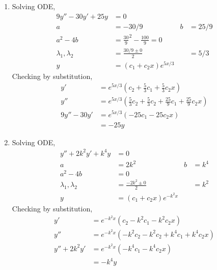 \begin{enumerate}
    \item Solving ODE,
          \begin{align}
              9y'' - 30y' + 25y        & = 0                                                 \\
              a                        & = -30/9                                & b & = 25/9 \\
              a^{2} - 4b               & = \frac{30}{9}^{2} - \frac{100}{9} = 0              \\
              \lambda_{1}, \lambda_{2} & = \frac{30/9 \pm 0}{2}                 &   & = 5/3  \\
              y                        & = (c_{1}+ c_{2}x)e^{5x/3}
          \end{align}
          Checking by substitution,
          \begin{align}
              y'         & = e^{5x/3}\left( c_{2} + \frac{5}{3} c_{1} + \frac{5}{3} c_{2}x \right)                                 \\
              y''        & = e^{5x/3}\left( \frac{5}{3} c_{2} + \frac{5}{3} c_{2} + \frac{25}{9}c_{1} + \frac{25}{9}c_{2}x \right) \\
              9y''- 30y' & = e^{5x/3}(-25c_{1} - 25c_{2}x)                                                                         \\
                         & = -25y
          \end{align}

    \item Solving ODE,
          \begin{align}
              y'' + 2k^{2}y' + k^{4}y  & = 0                                        \\
              a                        & = 2k^{2}                     & b & = k^{4} \\
              a^{2} - 4b               & = 0                                        \\
              \lambda_{1}, \lambda_{2} & = \frac{-2k^{2} \pm 0}{2}    &   & = k^{2} \\
              y                        & = (c_{1}+ c_{2}x)e^{-k^{2}x}
          \end{align}
          Checking by substitution,
          \begin{align}
              y'            & = e^{-k^{2}x}( c_{2} - k^{2} c_{1} - k^{2} c_{2}x)                    \\
              y''           & = e^{-k^{2}x}( -k^{2} c_{2} - k^{2} c_{2} + k^{4}c_{1} + k^{4}c_{2}x) \\
              y''+ 2k^{2}y' & = e^{-k^{2}x}(-k^{4}c_{1} - k^{4}c_{2}x)                              \\
                            & = -k^{4}y
          \end{align}


\end{enumerate}

